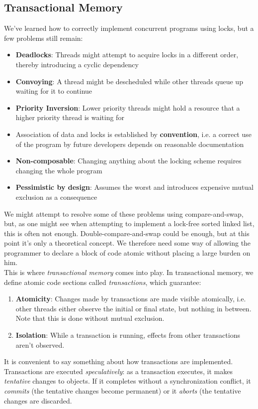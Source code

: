 \documentclass[main]{subfiles}
\begin{document}
\subsection{Transactional Memory}
We've learned how to correctly implement concurrent programs using locks, but a few problems still remain:
\begin{itemize}
    \item \textbf{Deadlocks}: Threads might attempt to acquire locks in a different order, thereby introducing a cyclic dependency
    \item \textbf{Convoying}: A thread might be descheduled while other threads queue up waiting for it to continue
    \item \textbf{Priority Inversion}: Lower priority threads might hold a resource that a higher priority thread is waiting for
    \item Association of data and locks is established by \textbf{convention}, i.e. a correct use of the program by future developers depends on reasonable documentation
    \item \textbf{Non-composable}: Changing anything about the locking scheme requires changing the whole program
    \item \textbf{Pessimistic by design}: Assumes the worst and introduces expensive mutual exclusion as a consequence
\end{itemize}
We might attempt to resolve some of these problems using compare-and-swap, but, as one might see when attempting to implement a lock-free sorted linked list, this is often not enough. Double-compare-and-swap could be enough, but at this point it's only a theoretical concept. We therefore need some way of allowing the programmer to declare a block of code atomic without placing a large burden on him.\\[3mm]
This is where \textit{transactional memory} comes into play. In transactional memory, we define atomic code sections called \textit{transactions}, which guarantee:
\begin{enumerate}
    \item \textbf{Atomicity}: Changes made by transactions are made visible atomically, i.e. other threads either observe the initial or final state, but nothing in between. Note that this is done without mutual exclusion.
    \item \textbf{Isolation}: While a transaction is running, effects from other transactions aren't observed.
\end{enumerate}
It is convenient to say something about how transactions are implemented. Transactions are executed \textit{speculatively}: as a transaction executes, it makes \textit{tentative} changes to objects. If it completes without a synchronization conflict, it \textit{commits} (the tentative changes become permanent) or it \textit{aborts} (the tentative changes are discarded.
\end{document}
